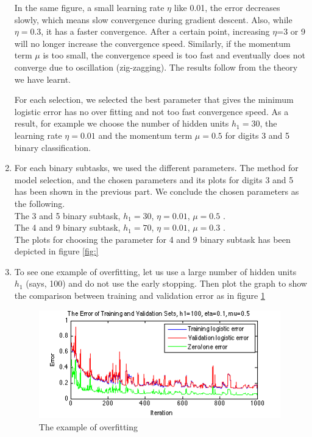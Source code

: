 \begin{enumerate}[(1)]
In the same figure, a small learning rate $\eta$ like 0.01, the error decreases slowly, which means slow convergence during gradient descent. Also, while  $\eta=0.3$, it has a faster convergence. After a certain point, increasing $\eta$=3 or 9 will no longer increase the convergence speed. Similarly, if the momentum term $\mu$ is too small, the convergence speed is too fast and eventually does not converge due to oscillation (zig-zagging). The results follow from the theory we have learnt.

For each selection, we selected the best parameter that gives the minimum logistic error has no over fitting and not too fast convergence speed. As a result, for example we choose the number of hidden units $h_1=30$, the learning rate $\eta=0.01$ and the momentum term $\mu=0.5$ for digits 3 and 5 binary classification.

\item For each binary subtasks, we used the different parameters. The method for model selection, and the chosen parameters and its plots for digits 3 and 5 has been shown in the previous part. We conclude the chosen parameters as the following.\\
The 3 and 5 binary subtask, $h_1=30$, $\eta=0.01$, $\mu=0.5$ . \\
The 4 and 9 binary subtask, $h_1=70$, $\eta=0.01$, $\mu=0.3$ . \\ 
The plots for choosing the parameter for 4 and 9 binary subtask has been depicted in figure \ref{fig:}

\item To see one example of overfitting, let us use a large number of hidden units $h_1$ (says, 100) and do not use the early stopping. Then plot the graph to show the comparison between training and validation error as in figure \ref{fig:overfitting}
	\begin{figure}[htbp]
		\centering
		\includegraphics[width=0.99\textwidth]{plots/overfitting.png}
		\caption{The example of overfitting}
		\label{fig:overfitting}
	\end{figure}
\end{enumerate}

